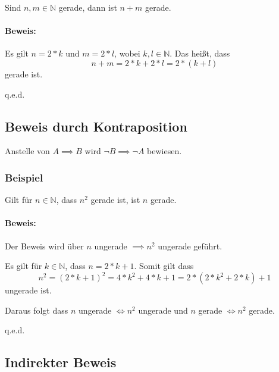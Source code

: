 \documentclass[12pt]{scrreprt}
\newcommand{\qed}{\begin{flushright}q.e.d.\end{flushright}}
\begin{document}
                    Sind $ n, m \in \mathbb{N} $ gerade, dann ist $ n + m $ gerade.

                    \paragraph{Beweis:}

                        Es gilt $ n = 2 * k $ und $ m = 2 * l $, wobei $ k, l \in \mathbb{N} $. Das heißt, dass \[ n + m = 2 * k + 2 * l = 2 * (k + l) \] gerade ist.

                        \qed


            \subsection{Beweis durch Kontraposition}
                \label{ss:grundbegriffe_beweise_kontraposition}

                Anstelle von $ A \implies B $ wird $ \lnot B \implies \lnot A $ bewiesen.

                \subsubsection{Beispiel}

                    Gilt für $ n \in \mathbb{N} $, dass $ n ^ 2 $ gerade ist, ist $ n $ gerade.

                    \paragraph{Beweis:}

                        Der Beweis wird über $ n $ ungerade $ \implies n ^ 2 $ ungerade geführt.

                        Es gilt für $ k \in \mathbb{N} $, dass $ n = 2 * k + 1 $. Somit gilt dass \[ n ^ 2 = (2 * k + 1) ^ 2 = 4 * k ^ 2 + 4 * k + 1 = 2 * (2 * k ^ 2 + 2 * k) + 1 \] ungerade ist.

                        Daraus folgt dass $ n $ ungerade $ \iff n ^ 2 $ ungerade und $ n $ gerade $ \iff n ^ 2 $ gerade.

                        \qed


            \subsection{Indirekter Beweis}
                \label{ss:grundbegriffe_beweise_indirekt}
\end{document}
